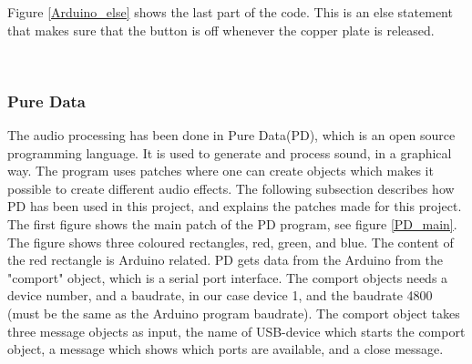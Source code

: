 Figure \ref{Arduino_else} shows the last part of the code. This is an else statement that makes sure that the button is off whenever the copper plate is released. 

\begin{minipage}{\linewidth}%
\label{Arduino_else}
\end{minipage}\\


\subsubsection{Pure Data}

The audio processing has been done in Pure Data(PD)\citep{PD_Info}, which is an open source programming language. It is used to generate and process sound, in a graphical way. 
The program uses patches where one can create objects which makes it possible to create different audio effects. The following subsection describes how PD has been used in this project, and explains the patches made for this project. \\

The first figure shows the main patch of the PD program, see figure \ref{PD_main}. The figure shows three coloured rectangles, red, green, and blue. 
The content of the red rectangle is Arduino related. PD gets data from the Arduino from the "comport" object, which is a serial port interface. 
The comport objects needs a device number, and a baudrate, in our case device 1, and the baudrate 4800 (must be the same as the Arduino program baudrate). The comport object takes three message objects as input, the name of USB-device which starts the comport object, a message which shows which ports are available, and a close message.   \\

\begin{minipage}{\linewidth}%
\label{PD_main}
\end{minipage}\\

